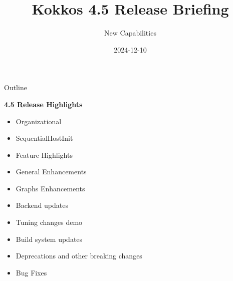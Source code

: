 
\usepackage{tikz}
\graphicspath{{4_5/figures/}}


\title{Kokkos 4.5 Release Briefing}

\author{New Capabilities}

\date{2024-12-10}



\shorttrue
\mediumfalse
\fullfalse



\begin{frame}
  \titlepage
\end{frame}


\begin{frame}[fragile]{Outline}

  \textbf{4.5 Release Highlights}

  \begin{itemize}
    \item{Organizational}
    \item{SequentialHostInit}
    \item{Feature Highlights}
    \item{General Enhancements}
    \item{Graphs Enhancements}
    \item{Backend updates}
    \item{Tuning changes demo}
    \item{Build system updates}
    \item{Deprecations and other breaking changes}
    \item{Bug Fixes}
  \end{itemize}

\end{frame}

